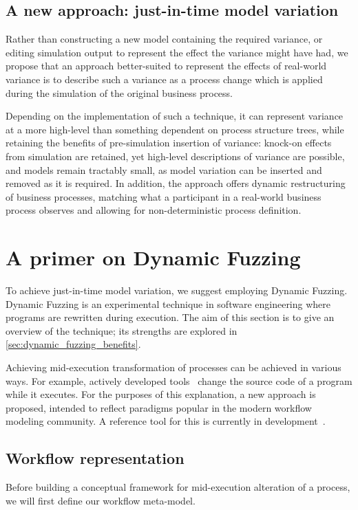 \documentclass[draft,12pt]{llncs}  %
\begin{document}
\subsection{A new approach: just-in-time model variation}
Rather than constructing a new model containing the required variance, or
editing simulation output to represent the effect the variance might have had,
we propose that an approach better-suited to represent the effects of real-world
variance is to describe such a variance as a process change which is applied
during the simulation of the original business process.
\par

Depending on the implementation of such a technique, it can represent variance
at a more high-level than something dependent on process structure trees, while
retaining the benefits of pre-simulation insertion of variance: knock-on effects
from simulation are retained, yet high-level descriptions of variance are
possible, and models remain tractably small, as model variation can be inserted
and removed as it is required. In addition, the approach offers dynamic
restructuring of business processes, matching what a participant in a real-world
business process observes and allowing for non-deterministic process definition.
\par

\section{A primer on Dynamic Fuzzing}
\label{sec:dynamic_fuzzing_explained}
To achieve just-in-time model variation, we suggest employing Dynamic Fuzzing.
Dynamic Fuzzing is an experimental technique in software engineering where programs are rewritten during
execution. The aim of this section is to give an overview of the technique; its
strengths are explored in \cref{sec:dynamic_fuzzing_benefits}.
\par

Achieving mid-execution transformation of processes can be achieved in various
ways. For example, actively developed tools~\citep{pdsf} change the source code
of a program while it executes. For the purposes of this explanation, a new
approach is proposed, intended to reflect paradigms popular in the modern
workflow modeling community. A reference tool for this is currently in
development~\citep{workflowgraphs}.

\subsection{Workflow representation}
Before building a conceptual framework for mid-execution alteration of a
process, we will first define our workflow meta-model.
\par
\end{document}
